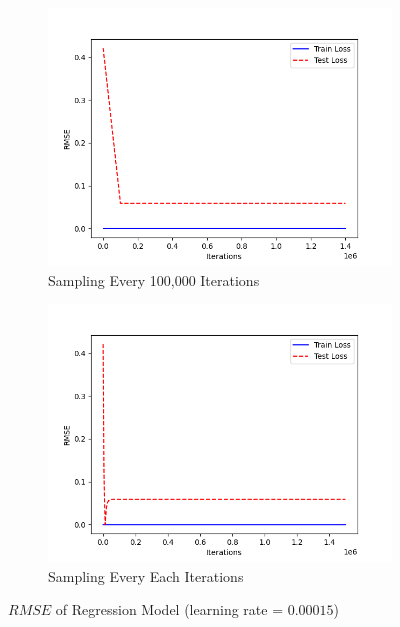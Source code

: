 \documentclass[a4paper, utf8]{ctexart}
\begin{document}
	\begin{figure}[htbp]
		\centering
		\begin{subfigure}{.48\textwidth}
			\centering
			\includegraphics[width=.95\linewidth]{./figure/1(a)3.png}
			\caption{Sampling Every 100,000 Iterations}
		\end{subfigure}
		\begin{subfigure}{.48\textwidth}
			\centering
			\includegraphics[width=.95\linewidth]{./figure/1(a)4.png}
			\caption{Sampling Every Each Iterations}
		\end{subfigure}
		\caption{$RMSE$ of Regression Model (learning rate = $0.00015$)}
	\end{figure}
	
\end{document}
